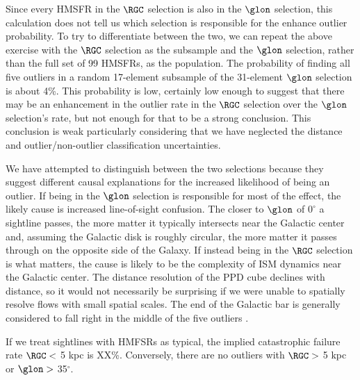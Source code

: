 Since every HMSFR in the $\RGC$ selection is also in the $\glon$ selection, this calculation does not tell us which selection is responsible for the enhance outlier probability. 
To try to differentiate between the two, we can repeat the above exercise with the $\RGC$ selection as the subsample and the $\glon$ selection, rather than the full set of 99 HMSFRs, as the population. 
The probability of finding all five outliers in a random 17-element subsample of the 31-element $\glon$ selection is about 4\%. 
This probability is low, certainly low enough to suggest that there may be an enhancement in the outlier rate in the $\RGC$ selection over the $\glon$ selection's rate, but not enough for that to be a strong conclusion.
This conclusion is weak particularly considering that we have neglected the distance and outlier/non-outlier classification uncertainties.

We have attempted to distinguish between the two selections because they suggest different causal explanations for the increased likelihood of being an outlier. 
If being in the $\glon$ selection is responsible for most of the effect, the likely cause is increased line-of-sight confusion. 
The closer to $\glon$ of $0^\circ$ a sightline passes, the more matter it typically intersects near the Galactic center and, assuming the Galactic disk is roughly circular, the more matter it passes through on the opposite side of the Galaxy. 
If instead being in the $\RGC$ selection is what matters, the cause is likely to be the complexity of ISM dynamics near the Galactic center.
The distance resolution of the PPD cube declines with distance, so it would not necessarily be surprising if we were unable to spatially resolve flows with small spatial scales.
The end of the Galactic bar is generally considered to fall right in the middle of the five outliers \cite{2016arXiv160207702B}.

If we treat sightlines with HMFSRs as typical, the implied catastrophic failure rate $\RGC <$ 5 kpc is XX\%. 
Conversely, there are no outliers with $\RGC >$ 5 kpc or $\glon >$ 35$^\circ$.

